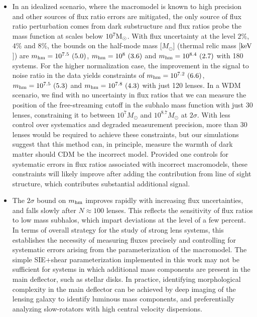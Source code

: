 \begin{itemize}
	\item In an idealized scenario, where the macromodel is known to high precision and other sources of flux ratio errors are mitigated, the only source of flux ratio perturbation comes from dark substructure and flux ratios probe the mass function at scales below $10^7 {\rm{M}_{\odot}}$. With flux uncertainty at the level $2\%$, $4\%$ and $8\%$, the bounds on the half-mode mass [$M_{\odot}$] (thermal relic mass [$\rm{keV}$]) are $m_{\rm{hm}}=10^{7.5} \ (5.0)$, $m_{\rm{hm}}=10^{8} \ (3.6)$ and $m_{\rm{hm}}=10^{8.4} \ (2.7)$ with 180 systems. For the higher normalization case, the improvement in the signal to noise ratio in the data yields constraints of $m_{\rm{hm}}=10^{7.2} \ (6.6)$, $m_{\rm{hm}}=10^{7.5} \ (5.3)$ and $m_{\rm{hm}}=10^{7.8} \ (4.3)$ with just 120 lenses. In a WDM scenario, we find with no uncertainty in flux ratios that we can measure the position of the free-streaming cutoff in the subhalo mass function with just 30 lenses, constraining it to between $10^{7}M_{\odot}$ and $10^{8.7} M_{\odot}$ at $2 \sigma$. With less control over systematics and degraded measurement precision, more than 30 lenses would be required to achieve these constraints, but our simulations suggest that this method can, in principle, measure the warmth of dark matter should CDM be the incorrect model. Provided one controls for systematic errors in flux ratios associated with incorrect macromodels, these constraints will likely improve after adding the contribution from line of sight structure, which contributes substantial additional signal.
	\item The $2 \sigma$ bound on $m_{\rm{hm}}$ improves rapidly with increasing flux uncertainties, and falls slowly after $N \approx 100$ lenses. This reflects the sensitivity of flux ratios to low mass subhalos, which impart deviations at the level of a few percent. In terms of overall strategy for the study of strong lens systems, this establishes the necessity of measuring fluxes precisely and controlling for systematic errors arising from the parameterization of the macromodel. The simple SIE+shear parameterization implemented in this work may not be sufficient for systems in which additional mass components are present in the main deflector, such as stellar disks. In practice, identifying morphological complexity in the main deflector can be achieved by deep imaging of the lensing galaxy to identify luminous mass components, and preferentially analyzing slow-rotators with high central velocity dispersions. 

\end{itemize}
